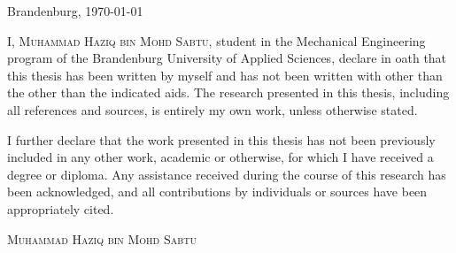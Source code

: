 \thispagestyle{empty}

\large
\begin{flushright}
  Brandenburg, \today
\end{flushright}

\vspace*{40mm}
I, {\scshape Muhammad Haziq bin Mohd Sabtu}, student in the Mechanical Engineering program of the Brandenburg University of Applied Sciences, declare in oath that this thesis has been written by myself and has not been written with other than the other than the indicated aids. The research presented in this thesis, including all references and sources, is entirely my own work, unless otherwise stated.

I further declare that the work presented in this thesis has not been previously included in any other work, academic or otherwise, for which I have received a degree or diploma. Any assistance received during the course of this research has been acknowledged, and all contributions by individuals or sources have been appropriately cited.

\vspace*{40mm}

\begin{flushright}
  {\scshape Muhammad Haziq bin Mohd Sabtu}
\end{flushright}

\normalsize
